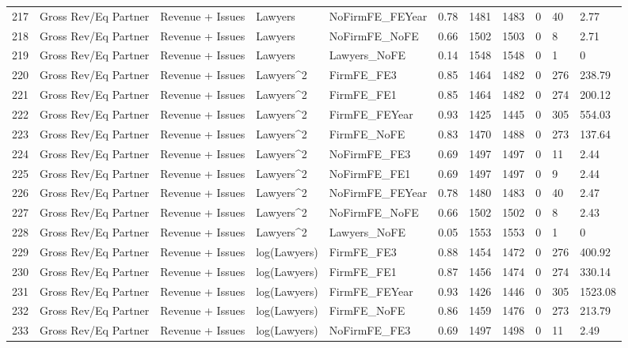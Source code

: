 \documentclass{article}
\begin{document}
\begin{table}[H]
\begin{tabular}{rllllllllll}
  217 & Gross Rev/Eq Partner & Revenue + Issues & Lawyers & NoFirmFE\_FEYear & 0.78 & 1481 & 1483 & 0 & 40 & 2.77 \\ 
  218 & Gross Rev/Eq Partner & Revenue + Issues & Lawyers & NoFirmFE\_NoFE & 0.66 & 1502 & 1503 & 0 & 8 & 2.71 \\ 
  219 & Gross Rev/Eq Partner & Revenue + Issues & Lawyers & Lawyers\_NoFE & 0.14 & 1548 & 1548 & 0 & 1 & 0 \\ 
  220 & Gross Rev/Eq Partner & Revenue + Issues & Lawyers^2 & FirmFE\_FE3 & 0.85 & 1464 & 1482 & 0 & 276 & 238.79 \\ 
  221 & Gross Rev/Eq Partner & Revenue + Issues & Lawyers^2 & FirmFE\_FE1 & 0.85 & 1464 & 1482 & 0 & 274 & 200.12 \\ 
  222 & Gross Rev/Eq Partner & Revenue + Issues & Lawyers^2 & FirmFE\_FEYear & 0.93 & 1425 & 1445 & 0 & 305 & 554.03 \\ 
  223 & Gross Rev/Eq Partner & Revenue + Issues & Lawyers^2 & FirmFE\_NoFE & 0.83 & 1470 & 1488 & 0 & 273 & 137.64 \\ 
  224 & Gross Rev/Eq Partner & Revenue + Issues & Lawyers^2 & NoFirmFE\_FE3 & 0.69 & 1497 & 1497 & 0 & 11 & 2.44 \\ 
  225 & Gross Rev/Eq Partner & Revenue + Issues & Lawyers^2 & NoFirmFE\_FE1 & 0.69 & 1497 & 1497 & 0 & 9 & 2.44 \\ 
  226 & Gross Rev/Eq Partner & Revenue + Issues & Lawyers^2 & NoFirmFE\_FEYear & 0.78 & 1480 & 1483 & 0 & 40 & 2.47 \\ 
  227 & Gross Rev/Eq Partner & Revenue + Issues & Lawyers^2 & NoFirmFE\_NoFE & 0.66 & 1502 & 1502 & 0 & 8 & 2.43 \\ 
  228 & Gross Rev/Eq Partner & Revenue + Issues & Lawyers^2 & Lawyers\_NoFE & 0.05 & 1553 & 1553 & 0 & 1 & 0 \\ 
  229 & Gross Rev/Eq Partner & Revenue + Issues & log(Lawyers) & FirmFE\_FE3 & 0.88 & 1454 & 1472 & 0 & 276 & 400.92 \\ 
  230 & Gross Rev/Eq Partner & Revenue + Issues & log(Lawyers) & FirmFE\_FE1 & 0.87 & 1456 & 1474 & 0 & 274 & 330.14 \\ 
  231 & Gross Rev/Eq Partner & Revenue + Issues & log(Lawyers) & FirmFE\_FEYear & 0.93 & 1426 & 1446 & 0 & 305 & 1523.08 \\ 
  232 & Gross Rev/Eq Partner & Revenue + Issues & log(Lawyers) & FirmFE\_NoFE & 0.86 & 1459 & 1476 & 0 & 273 & 213.79 \\ 
  233 & Gross Rev/Eq Partner & Revenue + Issues & log(Lawyers) & NoFirmFE\_FE3 & 0.69 & 1497 & 1498 & 0 & 11 & 2.49 \\ 

\end{tabular}
\end{table}
\end{document}
